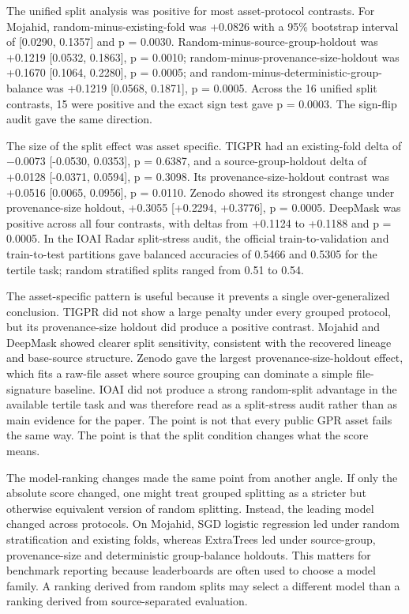 \documentclass[]{interact}
\begin{document}
The unified split analysis was positive for most asset-protocol contrasts. For Mojahid, random-minus-existing-fold was +0.0826 with a 95\% bootstrap interval of [0.0290, 0.1357] and p = 0.0030. Random-minus-source-group-holdout was +0.1219 [0.0532, 0.1863], p = 0.0010; random-minus-provenance-size-holdout was +0.1670 [0.1064, 0.2280], p = 0.0005; and random-minus-deterministic-group-balance was +0.1219 [0.0568, 0.1871], p = 0.0005. Across the 16 unified split contrasts, 15 were positive and the exact sign test gave p = 0.0003. The sign-flip audit gave the same direction.

The size of the split effect was asset specific. TIGPR had an existing-fold delta of \(-0.0073\) [-0.0530, 0.0353], p = 0.6387, and a source-group-holdout delta of +0.0128 [-0.0371, 0.0594], p = 0.3098. Its provenance-size-holdout contrast was +0.0516 [0.0065, 0.0956], p = 0.0110. Zenodo showed its strongest change under provenance-size holdout, +0.3055 [+0.2294, +0.3776], p = 0.0005. DeepMask was positive across all four contrasts, with deltas from +0.1124 to +0.1188 and p = 0.0005. In the IOAI Radar split-stress audit, the official train-to-validation and train-to-test partitions gave balanced accuracies of 0.5466 and 0.5305 for the tertile task; random stratified splits ranged from 0.51 to 0.54.

The asset-specific pattern is useful because it prevents a single over-generalized conclusion. TIGPR did not show a large penalty under every grouped protocol, but its provenance-size holdout did produce a positive contrast. Mojahid and DeepMask showed clearer split sensitivity, consistent with the recovered lineage and base-source structure. Zenodo gave the largest provenance-size-holdout effect, which fits a raw-file asset where source grouping can dominate a simple file-signature baseline. IOAI did not produce a strong random-split advantage in the available tertile task and was therefore read as a split-stress audit rather than as main evidence for the paper. The point is not that every public GPR asset fails the same way. The point is that the split condition changes what the score means.

The model-ranking changes made the same point from another angle. If only the absolute score changed, one might treat grouped splitting as a stricter but otherwise equivalent version of random splitting. Instead, the leading model changed across protocols. On Mojahid, SGD logistic regression led under random stratification and existing folds, whereas ExtraTrees led under source-group, provenance-size and deterministic group-balance holdouts. This matters for benchmark reporting because leaderboards are often used to choose a model family. A ranking derived from random splits may select a different model than a ranking derived from source-separated evaluation.
\end{document}
